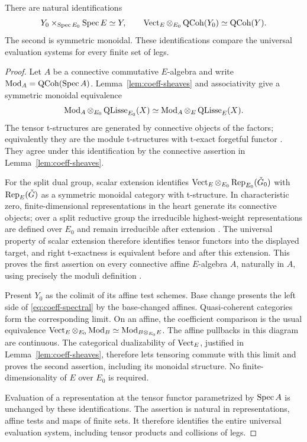 \begin{lemma}\label{lem:coeff-spectral}
There are natural identifications
\begin{equation}\label{eq:coeff-spectral}
 Y_0\times_{\operatorname{Spec} E_0}\operatorname{Spec} E\simeq Y,
 \qquad
 \operatorname{Vect}_E\otimes_{E_0}\operatorname{QCoh}(Y_0)\simeq\operatorname{QCoh}(Y).
\end{equation}
The second is symmetric monoidal. These identifications compare the
universal evaluation systems for every finite set of legs.
\end{lemma}
\begin{proof}
Let $A$ be a connective commutative $E$-algebra and write
$\operatorname{Mod}_A=\operatorname{QCoh}(\operatorname{Spec} A)$. Lemma~\ref{lem:coeff-sheaves}
and associativity give a symmetric monoidal equivalence
\[
 \operatorname{Mod}_A\otimes_{E_0}\operatorname{QLisse}_{E_0}(X)
 \simeq
 \operatorname{Mod}_A\otimes_E\operatorname{QLisse}_E(X).
\]
The tensor t-structures are generated by connective objects of the
factors; equivalently they are the module t-structures with t-exact
forgetful functor \cite[\S1.4.1]{AGKRRV}. They agree under this
identification by the connective assertion in
Lemma~\ref{lem:coeff-sheaves}.

For the split dual group, scalar extension identifies
$\operatorname{Vect}_E\otimes_{E_0}\operatorname{Rep}_{E_0}(\check G_0)$ with
$\operatorname{Rep}_E(\check G)$ as a symmetric monoidal category with t-structure.
In characteristic zero, finite-dimensional representations in the
heart generate its connective objects; over a split reductive group
the irreducible highest-weight representations are defined over
$E_0$ and remain irreducible after extension
\cite[Theorem~22.2, \S\S22.3--22.5 and Theorem~22.42]{Milne}.
The universal property of scalar extension therefore identifies
tensor functors into the displayed target, and right t-exactness is
equivalent before and after this extension. This proves the first
assertion on every connective affine $E$-algebra $A$, naturally in
$A$, using precisely the moduli definition
\cite[\S1.4.2]{AGKRRV}.

Present $Y_0$ as the colimit of its affine test schemes. Base change
presents the left side of \eqref{eq:coeff-spectral} by the base-changed
affines. Quasi-coherent categories form the corresponding limit.
On an affine, the coefficient comparison is the usual equivalence
$\operatorname{Vect}_E\otimes_{E_0}\operatorname{Mod}_B
\simeq\operatorname{Mod}_{B\otimes_{E_0}E}$.
The affine pullbacks in this diagram are continuous. The categorical
dualizability of $\operatorname{Vect}_E$, justified in
Lemma~\ref{lem:coeff-sheaves}, therefore lets tensoring commute with
this limit and proves the second assertion, including its monoidal
structure. No finite-dimensionality of $E$ over $E_0$ is required.

Evaluation of a representation at the tensor functor parametrized by
$\operatorname{Spec} A$ is unchanged by these identifications. The assertion is
natural in representations, affine tests and maps of finite sets.
It therefore identifies the entire universal evaluation system,
including tensor products and collisions of legs.
\end{proof}

